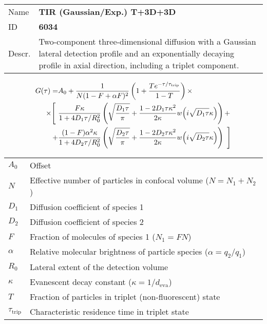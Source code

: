 \noindent \begin{tabular}{lp{}}
Name & \textbf{TIR (Gaussian/Exp.) T+3D+3D} \\ 
ID & \textbf{6034} \\ 
Descr. &  Two-component three-dimensional diffusion with a Gaussian lateral detection profile and an exponentially decaying profile in axial direction, including a triplet component\cite{Starr2001, Hassler2005, Ohsugi2006, Elson1974, Aragon1976, Palmer1987, Thomps:bookFCS2002}. \\
\end{tabular}
\begin{align}
G(\tau) = &A_0 + \frac{1}{N (1-F + \alpha F)^2} \left(1 + \frac{T e^{-\tau/\tau_\mathrm{trip}}}{1-T}  \right)  \times \\
\notag \times  \Bigg[ \,\, & 
\frac{F \kappa}{1+ 4 D_1 \tau/R_0^2} 
\left( \sqrt{\frac{D_1 \tau}{\pi}} + \frac{1 - 2 D_1 \tau \kappa^2}{2 \kappa}  w\!\left(i \sqrt{D_1 \tau} \kappa\right) \right) + \\
 \notag + &
\frac{(1-F) \alpha^2 \kappa}{1+ 4 D_2 \tau/R_0^2} 
\left( \sqrt{\frac{D_2 \tau}{\pi}} + \frac{1 - 2 D_2 \tau \kappa^2}{2 \kappa}  w\!\left(i \sqrt{D_2 \tau} \kappa\right) \right) \,\, \Bigg]
\end{align} 
\begin{center}
\begin{tabular}{ll}
$A_0$ & Offset \\ 
$N$ & Effective number of particles in confocal volume ($N = N_1+N_2$) \\ 
$D_1$ &  Diffusion coefficient of species 1 \\ 
$D_2$ &  Diffusion coefficient of species 2 \\ 
$F$ & Fraction of molecules of species 1 ($N_1 = F N$) \\
$\alpha$ & Relative molecular brightness of particle species ($ \alpha = q_2/q_1$) \\
$R_0$ & Lateral extent of the detection volume \\
$\kappa$ &  Evanescent decay constant ($\kappa = 1/d_\mathrm{eva}$)\\ 
$T$ &  Fraction of particles in triplet (non-fluorescent) state\\ 
$\tau_\mathrm{trip}$ &  Characteristic residence time in triplet state \\ 
\end{tabular}
\end{center}
\vspace{2em}




